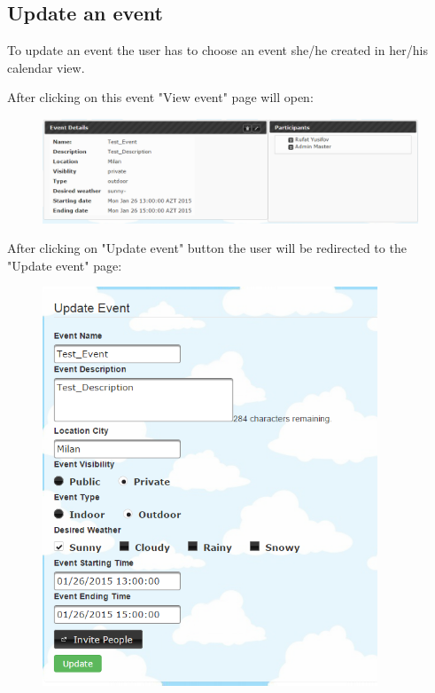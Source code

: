 \subsection{Update an event}
\par \qquad To update an event the user has to choose an event she/he created in her/his calendar view.
\par After clicking on this event "View event" page will open:
  \begin{figure}[tbh]
  \begin{center}
    \includegraphics[width=150mm]{viewev}
  \end{center}
\end{figure}

\newpage
\par After clicking on "Update event" button the user will be redirected to the "Update event" page:
  \begin{figure}[tbh]
  \begin{center}
    \includegraphics[width=100mm]{upevent}
  \end{center}
\end{figure}

